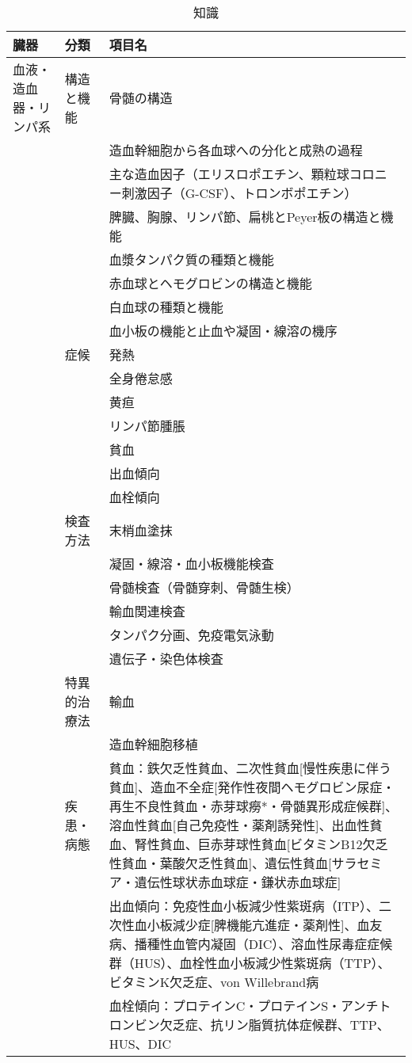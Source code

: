 \begin{xltabular}{\linewidth}{XXX}
\caption{\label{tbl:知識}知識} \\
\toprule
臓器 & 分類 & 項目名 \\
\midrule
\endhead
血液・造血器・リンパ系 & 構造と機能 & 骨髄の構造 \\
 &  & 造血幹細胞から各血球への分化と成熟の過程 \\
 &  & 主な造血因子（エリスロポエチン、顆粒球コロニー刺激因子（G-CSF）、トロンボポエチン） \\
 &  & 脾臓、胸腺、リンパ節、扁桃とPeyer板の構造と機能 \\
 &  & 血漿タンパク質の種類と機能 \\
 &  & 赤血球とヘモグロビンの構造と機能 \\
 &  & 白血球の種類と機能 \\
 &  & 血小板の機能と止血や凝固・線溶の機序 \\
 & 症候 & 発熱 \\
 &  & 全身倦怠感 \\
 &  & 黄疸 \\
 &  & リンパ節腫脹 \\
 &  & 貧血 \\
 &  & 出血傾向 \\
 &  & 血栓傾向 \\
 & 検査方法 & 末梢血塗抹 \\
 &  & 凝固・線溶・血小板機能検査 \\
 &  & 骨髄検査（骨髄穿刺、骨髄生検） \\
 &  & 輸血関連検査 \\
 &  & タンパク分画、免疫電気泳動 \\
 &  & 遺伝子・染色体検査 \\
 & 特異的治療法 & 輸血 \\
 &  & 造血幹細胞移植 \\
 & 疾患・病態 & 貧血：鉄欠乏性貧血、二次性貧血[慢性疾患に伴う貧血]、造血不全症[発作性夜間ヘモグロビン尿症・再生不良性貧血・赤芽球癆*・骨髄異形成症候群]、溶血性貧血[自己免疫性・薬剤誘発性]、出血性貧血、腎性貧血、巨赤芽球性貧血[ビタミンB12欠乏性貧血・葉酸欠乏性貧血]、遺伝性貧血[サラセミア・遺伝性球状赤血球症・鎌状赤血球症] \\
 &  & 出血傾向：免疫性血小板減少性紫斑病（ITP）、二次性血小板減少症[脾機能亢進症・薬剤性]、血友病、播種性血管内凝固（DIC）、溶血性尿毒症症候群（HUS）、血栓性血小板減少性紫斑病（TTP）、ビタミンK欠乏症、von Willebrand病 \\
 &  & 血栓傾向：プロテインC・プロテインS・アンチトロンビン欠乏症、抗リン脂質抗体症候群、TTP、HUS、DIC \\

\end{xltabular}
